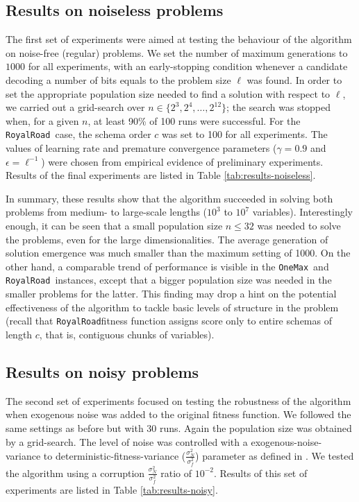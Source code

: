 \documentclass{sig-alternate}
\newcommand{\onemax}{\texttt{OneMax}}
\newcommand{\rroad}{\texttt{RoyalRoad}}
\begin{document}
\subsection{Results on noiseless problems}
The first set of experiments were aimed at testing the behaviour of the algorithm on noise-free (regular) problems. We set the number of maximum generations to $1000$ for all experiments, with an early-stopping condition whenever a candidate decoding a number of bits equals to the problem size $\ell$ was found. In order to set the appropriate population size needed to find a solution with respect to $\ell$, we carried out a grid-search \cite{Hsu2003} over $n \in\{2^3,2^4,\ldots,2^{12}\}$; the search was stopped when, for a given $n$, at least 90\% of 100 runs were successful. For the \rroad~case, the schema order $c$ was set to 100 for all experiments. The values of learning rate and premature convergence parameters ($\gamma=0.9$ and $\epsilon=\ell^{-1}$) were chosen from empirical evidence of preliminary experiments. Results of the final experiments are listed in Table \ref{tab:results-noiseless}.

In summary, these results show that the algorithm succeeded in solving both problems from medium- to large-scale lengths ($10^3$ to $10^7$ variables). Interestingly enough, it can be seen that a small population size $n \le 32$ was needed to solve the problems, even for the large dimensionalities. The average generation of solution emergence was much smaller than the maximum setting of 1000. On the other hand, a comparable trend of performance is visible in the \onemax~and \rroad~\mbox{instances}, except that a bigger population size was needed in the smaller problems for the latter. This finding may drop a hint on the potential \mbox{effectiveness} of the algorithm to tackle basic levels of structure in the problem (recall that \rroad fitness function assigns score only to entire schemas of length $c$, that is, contiguous chunks of variables).   

\subsection{Results on noisy problems}
The second set of experiments focused on testing the robustness of the algorithm when exogenous noise was added to the original fitness function. We followed the same settings as before but with 30 runs. Again the population size was obtained by a grid-search. The level of noise was controlled with a exogenous-noise-variance to deterministic-fitness-variance ($\frac{\sigma^2_N}{\sigma^2_f}$) parameter as defined in \cite{Sastry07}. We tested the algorithm using a corruption $\frac{\sigma^2_N}{\sigma^2_f}$ ratio of $10^{-2}$. Results of this set of experiments are listed in Table \ref{tab:results-noisy}.
\end{document}
